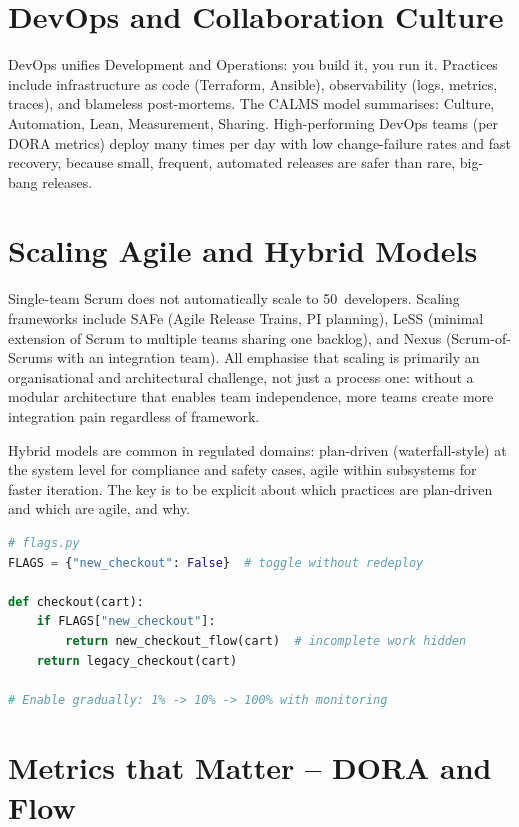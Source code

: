 \section{DevOps and Collaboration Culture}

DevOps unifies Development and Operations: you build it, you run it. Practices include infrastructure as code (Terraform, Ansible), observability (logs, metrics, traces), and blameless post-mortems. The CALMS model summarises: Culture, Automation, Lean, Measurement, Sharing. High-performing DevOps teams (per DORA metrics) deploy many times per day with low change-failure rates and fast recovery, because small, frequent, automated releases are safer than rare, big-bang releases.


\section{Scaling Agile and Hybrid Models}

Single-team Scrum does not automatically scale to 50~developers. Scaling frameworks include SAFe (Agile Release Trains, PI planning), LeSS (minimal extension of Scrum to multiple teams sharing one backlog), and Nexus (Scrum-of-Scrums with an integration team). All emphasise that scaling is primarily an organisational and architectural challenge, not just a process one: without a modular architecture that enables team independence, more teams create more integration pain regardless of framework.

Hybrid models are common in regulated domains: plan-driven (waterfall-style) at the system level for compliance and safety cases, agile within subsystems for faster iteration. The key is to be explicit about which practices are plan-driven and which are agile, and why.

\begin{lstlisting}[language=Python,caption={Feature flag for trunk-based development.}]
# flags.py
FLAGS = {"new_checkout": False}  # toggle without redeploy

def checkout(cart):
    if FLAGS["new_checkout"]:
        return new_checkout_flow(cart)  # incomplete work hidden
    return legacy_checkout(cart)

# Enable gradually: 1% -> 10% -> 100% with monitoring
\end{lstlisting}


\section{Metrics that Matter -- DORA and Flow}

